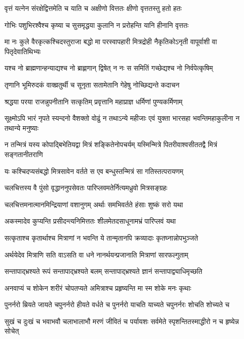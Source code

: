 \twolineshloka
{वृत्तं यत्नेन संरक्षेद्वित्तमेति च याति च}
{अक्षीणो वित्ततः क्षीणो वृत्ततस्तु हतो हतः}


\twolineshloka
{गोभिः पशुभिरश्वैश्च कृष्या च सुसमृद्धया}
{कुलानि न प्ररोहन्ति यानि हीनानि वृत्ततः}


\twolineshloka
{मा नः कुले वैरकृत्कश्चिदस्तुराजा बद्धो मा परस्वापहारी}
{मित्रद्रोही नैकृतिकोऽनृती वापूर्वाशी वा पितृदेवातिथिभ्यः}


\twolineshloka
{यश्च नो ब्राह्मणान्हन्याद्यश्च नो ब्राह्णणान् द्विषेत्}
{न नः स समितिं गच्छेद्यश्च नो निर्वपेत्कृषिम्}


\twolineshloka
{तृणानि भूमिरुदकं वाक्व्रतुर्थी च सूनृता}
{सतामेतानि गेहेषु नोच्छिद्यन्ते कदाचन}


\twolineshloka
{श्रद्धया परया राजन्नुपनीतानि सत्कृतिम्}
{प्रवृत्तानि महाप्राज्ञ धर्मिणां पुण्यकर्मिणाम्}


\twolineshloka
{सूक्ष्मोऽपि भारं नृपते स्यन्दनो वैशक्तो वोढुं न तथाऽन्ये महीजाः}
{एवं युक्ता भारसहा भवन्तिमहाकुलीना न तथान्ये मनुष्याः}


\twolineshloka
{न तन्मित्रं यस्य कोपाद्बिभेतियद्वा मित्रं शङ्कितेनोपचर्यम्}
{यस्मिन्मित्रे पितरीवाश्वसीततद्वै मित्रं सङ्गतानीतराणि}


\twolineshloka
{यः कश्चिदप्यसंबद्धो मित्रसावेन वर्तते}
{स एव बन्धुस्तन्मित्रं सा गतिस्तत्परायणम्}


\twolineshloka
{चलचित्तस्य वै पुंसो वृद्धाननुपसेवतः}
{पारिप्लवमतेर्नित्यमध्रुवो मित्रसङ्ग्रहः}


\twolineshloka
{चलचित्तमनात्मानमिन्द्रियाणां वशानुगम्}
{अर्थाः समभिवर्तते हंसाः शुष्कं सरो यथा}


\twolineshloka
{अकस्मादेव कुप्यन्ति प्रसीदन्त्यनिमित्ततः}
{शीलमेतदसाधूनामभ्रं पारिप्लवं यथा}


\twolineshloka
{सत्कृताश्च कृतार्थाश्च मित्राणां न भवन्ति ये}
{तान्मृतानपि क्रव्यादाः कृतघ्नान्नोपभुञ्जते}


\twolineshloka
{अर्थयेदेव मित्राणि सति वाऽसति वा धने}
{नानर्थयन्प्रजानाति मित्राणां सारफल्गुताम्}


\twolineshloka
{सन्तापाद्भ्रश्यते रूपं सन्तापाद्भ्रश्यते बलम्}
{सन्तापाद्भ्रश्यते ज्ञानं सन्तापाद्व्याधिमृच्छति}


\twolineshloka
{अनवाप्यं च शोकेन शरीरं चोपतप्यते}
{अमित्राश्च प्रहृष्यन्ति मा स्म शोके मनः कृथाः}


\twolineshloka
{पुनर्नरो म्रियते जायते चपुनर्नरो हीयते वर्धते च}
{पुनर्नरो याचति याच्यते चपुनर्नरः शोचति शोच्यते च}


\twolineshloka
{सुखं च दुःखं च भवाभवौ चलाभालाभौ मरणं जीवितं च}
{पर्यायशः सर्वमेते स्पृशन्तितस्माद्धीरो न च हृष्येन्न सोचेत्}


